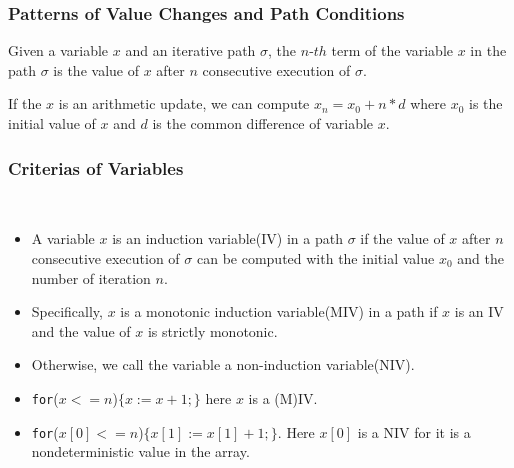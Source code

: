 \documentclass[11pt]{beamer}
\begin{document}
\begin{frame}\frametitle{Patterns of Value Changes and Path Conditions}

\begin{definition}
Given a variable $x $ and an iterative  path $\sigma$, the $n$-$th$ term of the variable $x$ in the path $\sigma$ is the value of $x$ after $n$ consecutive execution of $\sigma$.

\end{definition}

\begin{example}
If the $x$ is an arithmetic update, we can compute $x_n = x_0 + n*d$ where $x_0$ is the initial value of $x$ and $d$ is the common difference of variable $x$.
\end{example}
\end{frame}

\begin{frame}\frametitle{Criterias of Variables}
\begin{definition}\
\begin{itemize}

\item A variable $x$ is an induction variable(IV) in a path $\sigma$ if the value of $x$ after $n$ consecutive execution of $\sigma$ can be computed with the initial value $x_0$ and the number of iteration $n$.

\item Specifically, $x$ is a monotonic induction variable(MIV) in a path if $x$ is an IV and the value of $x$ is strictly monotonic.

\item Otherwise, we call the variable a non-induction variable(NIV).

\end{itemize}


\end{definition}
\begin{example}
\begin{itemize}

\item \texttt{for}($x <= n$)$\{x := x + 1;\}$ here $x$ is a (M)IV.

\item \texttt{for}($x[0] <= n$)$\{x[1] := x[1] + 1;\}$. Here $x[0]$ is a NIV for it is a nondeterministic value in the array.
\end{itemize}

\end{example}
\end{frame}
\end{document}
